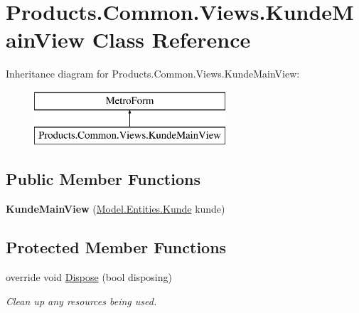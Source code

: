 \hypertarget{class_products_1_1_common_1_1_views_1_1_kunde_main_view}{}\section{Products.\+Common.\+Views.\+Kunde\+Main\+View Class Reference}
\label{class_products_1_1_common_1_1_views_1_1_kunde_main_view}
Inheritance diagram for Products.\+Common.\+Views.\+Kunde\+Main\+View\+:\begin{figure}[H]
\begin{center}
\leavevmode
\includegraphics[height=2.000000cm]{class_products_1_1_common_1_1_views_1_1_kunde_main_view}
\end{center}
\end{figure}
\subsection*{Public Member Functions}
\begin{DoxyCompactItemize}
\item 
{\bfseries Kunde\+Main\+View} (\hyperlink{class_products_1_1_model_1_1_entities_1_1_kunde}{Model.\+Entities.\+Kunde} kunde)\hypertarget{class_products_1_1_common_1_1_views_1_1_kunde_main_view_ac37d7de19a52093c1ba0e02b77e99498}{}\label{class_products_1_1_common_1_1_views_1_1_kunde_main_view_ac37d7de19a52093c1ba0e02b77e99498}

\end{DoxyCompactItemize}
\subsection*{Protected Member Functions}
\begin{DoxyCompactItemize}
\item 
override void \hyperlink{class_products_1_1_common_1_1_views_1_1_kunde_main_view_a9e35ae561074a756447a7bdce78486c0}{Dispose} (bool disposing)
\begin{DoxyCompactList}\small\item\em Clean up any resources being used. \end{DoxyCompactList}\end{DoxyCompactItemize}


